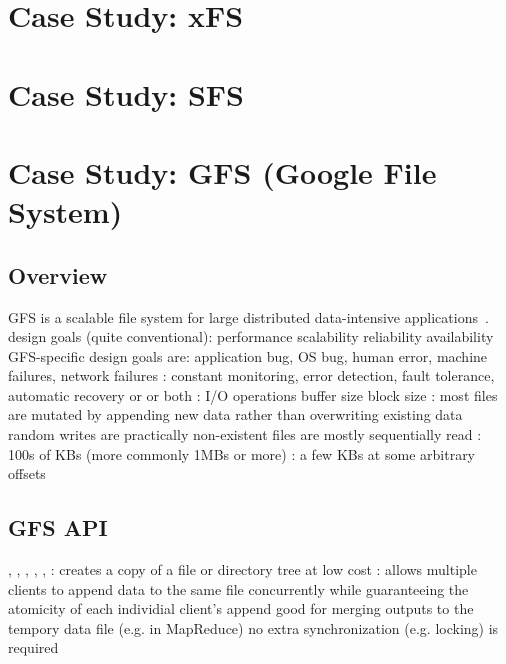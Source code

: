 \documentclass{note}
\begin{document}
%
%
%
\section{Case Study: xFS}

%
%
%
\section{Case Study: SFS}

%
%
%
\section{Case Study: GFS (Google File System)}
\subsection{Overview}
\bit
\w GFS is a scalable file system for large distributed
data-intensive applications~\cite{Ghemawat03}.
\w design goals (quite conventional):
  \bit
  \w performance
  \w scalability
  \w reliability
  \w availability
  \eit
\w GFS-specific design goals
  \bit
  \w {}
      \bit
       are:
       application bug, OS bug, human error, machine failures, network
       failures 
      : constant monitoring, error detection, fault
      tolerance, automatic recovery
      \eit
  \w {} or  or
  both 
     \bit
     \w {}:
        \bit
        \w I/O operations 
        \w buffer size
        \w block size
        \eit
     \eit
  \w {}: most files are mutated by appending new data rather than overwriting existing data
    \bit
    \w random writes are practically non-existent
    \w files are mostly sequentially read 
        \bit
        \w {}: 100s of KBs (more commonly 1MBs or more)
        \w {}: a few KBs at some arbitrary offsets
        \eit
    \eit
  \w {}
  \w {}
  \eit
\eit

\subsection{GFS API}
\bit
\w {}, , , , , 
\w {}: creates a copy of a file or directory tree at low cost
\w {}: allows multiple clients to append data to the same file
concurrently while guaranteeing the atomicity of each individial client's
append 
   \bit
   \w good for merging outputs to the tempory data file (e.g. in MapReduce)
   \w no extra synchronization (e.g. locking) is required
   \eit
\eit
\end{document}
